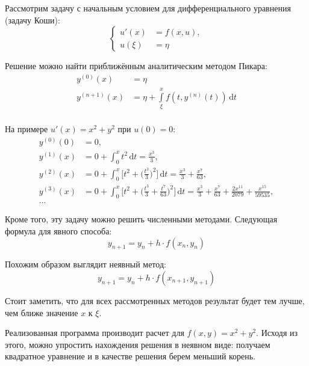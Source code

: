 \documentclass[a4paper,14pt]{extreport}
\begin{document}


Рассмотрим задачу с начальным условием для дифференциального уравнения (задачу Коши):
\begin{equation}
	\left\{
	\begin{aligned}
		u'(x) &= f(x, u), \\
		u(\xi) &= \eta
	\end{aligned}
	\right.
\end{equation}

Решение можно найти приближённым аналитическим методом Пикара:
\begin{equation}
	\begin{aligned}
		y^{(0)}(x) &= \eta \\
		y^{(n+1)}(x) &= \eta + \int\limits_{\xi}^x f(t, y^{(n)}(t))\,\mathrm dt \\
	\end{aligned}
\end{equation}

На примере $u'(x) = x^2 + y^2$ при $u(0) = 0$:
\begin{equation}
	\begin{aligned}
		y^{(0)}(0) &= 0, \\
		y^{(1)}(x) &= 0 + \int_0^x t^2\,\mathrm dt = \frac{x^3}{3}, \\
		y^{(2)}(x) &= 0 + \int_0^x \bigg[t^2 + \bigg(\frac{t^3}{3}\bigg)^2\bigg] \,\mathrm dt = \frac{x^3}{3} + \frac{x^7}{63}, \\
		y^{(3)}(x) &= 0 + \int_0^x \bigg[t^2 + \bigg(\frac{t^3}{3} + \frac{t^7}{63}\bigg)^2\bigg] \,\mathrm dt = \frac{x^3}{3} + \frac{x^7}{63} + \frac{2x^{11}}{2079} + \frac{x^{15}}{59535}, \\
		\dots
	\end{aligned}
\end{equation}

Кроме того, эту задачу можно решить численными методами.
Следующая формула для явного способа:
\begin{equation}
	y_{n+1} = y_n + h \cdot f(x_n, y_n)
\end{equation}

Похожим образом выглядит неявный метод:
\begin{equation}
	y_{n+1} = y_n + h \cdot f(x_{n+1}, y_{n+1})
\end{equation}

Стоит заметить, что для всех рассмотренных методов результат будет тем лучше, чем ближе значение $x$ к $\xi$.

Реализованная программа производит расчет для $f(x, y) = x^2 + y^2$.
Исходя из этого, можно упростить нахождения решения в неявном виде: получаем квадратное уравнение и в качестве решения берем меньший корень.






\end{document}
